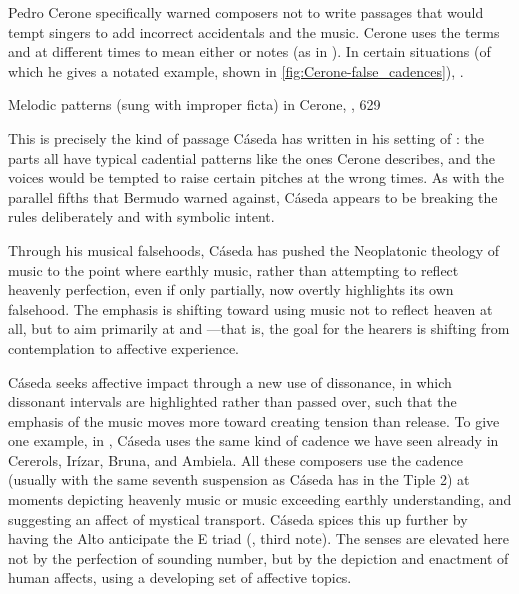 Pedro Cerone specifically warned composers not to write passages that would
tempt singers to add incorrect accidentals and  the music.
Cerone uses the terms  and  at different
times to mean either  or  notes (as in
).
In certain situations (of which he gives a notated example, shown in
\cref{fig:Cerone-false_cadences}), .%
    \Autocite[629]{Cerone:Melopeo}

{Melodic patterns  (sung with improper
ficta) in Cerone, , 629} 

This is precisely the kind of passage Cáseda has written in his setting of
: the parts all have typical cadential patterns like
the ones Cerone describes, and the voices would be tempted to raise certain
pitches at the wrong times. 
As with the parallel fifths that Bermudo warned against, Cáseda appears to be
breaking the rules deliberately and with symbolic intent.

Through his musical falsehoods, Cáseda has pushed the Neoplatonic theology of
music to the point where earthly music, rather than attempting to reflect
heavenly perfection, even if only partially, now overtly highlights its own
falsehood.
The emphasis is shifting toward using music not to reflect heaven at all, but
to aim primarily at  and ---that is, the goal for the hearers is shifting from contemplation to
affective experience.

Cáseda seeks affective impact through a new use of dissonance, in which
dissonant intervals are highlighted rather than passed over, such that the
emphasis of the music moves more toward creating tension than release.
To give one example, in , Cáseda uses the same kind of
 cadence we have seen already in Cererols, Irízar, Bruna, and
Ambiela.  
All these composers use the cadence (usually with the same seventh suspension
as Cáseda has in the Tiple 2) at moments depicting heavenly music or music
exceeding earthly understanding, and suggesting an affect of mystical
transport.
Cáseda spices this up further by having the Alto anticipate the E\fl{} triad
(, third note).
The senses are elevated here not by the perfection of sounding number, but by
the depiction and enactment of human affects, using a developing set of
affective topics.

